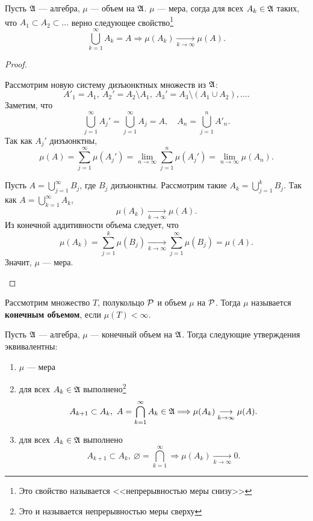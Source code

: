 \begin{thm}
    Пусть $ \A$ --- алгебра, $ \mu$ --- объем на $ \A$. $ \mu $ --- мера, согда
	для всех $ A_k \in \A$ таких, что $ A_1 \subset A_2 \subset  \ldots $ верно следующее свойство\footnote{Это свойство называется <<непрерывностью меры  снизу>>}
	\[
		\bigcup_{k=1}^{\infty} A_k = A \Longrightarrow \mu (A_k) \underset{k \to  \infty}{ \longrightarrow} \mu (A)
	.\] 
\end{thm}
\begin{proof}
    $ $
    \begin{description}
        \item {} Рассмотрим новую систему дизъюнктных множеств из $ \A$:
			 \[
				 A'_1 = A_1, ~A_2' = A_2 \setminus A_1, ~A_3' = A_3\setminus (A_1\cup A_2) , \ldots 
			.\] 
			Заметим, что
			\[
			\bigcup_{j=1}^{\infty} A_j' = \bigcup_{j=1}^{\infty} A_j = A, \quad  A_n = \bigcup_{j=1}^{n} A'_n
			.\] 
			Так как $ A_j'$ дизъюнктны, 
			\[
				\mu (A) = \sum_{j=1}^{\infty} \mu (A_j') = \lim_{n \to \infty} \sum_{j=1}^{n} \mu (A_j') = \lim_{n \to \infty} \mu (A_n)
			.\]
        \item {} 
			Пусть $ A = \bigcup\limits_{j=1}^{\infty} B_j$, где $ B_j$ дизъюнктны. Рассмотрим такие $ A_k = \bigcup\limits_{j=1}^{k} B_j$. Так как $ A =  \bigcup\limits_{k=1}^{\infty} A_k$,
			\[
				\mu (A_k) \underset{k \to  \infty}{\longrightarrow} \mu (A)
			.\] 
		Из конечной аддитивности объема следует, что
		 \[
			 \mu (A_k) = \sum_{j=1}^{k} \mu (B_j) \underset{k \to  \infty}{\longrightarrow}\sum_{j=1}^{\infty} \mu (B_j) = \mu (A)
		.\] 
		Значит, $ \mu $ --- мера.
    \end{description} 
\end{proof}
\begin{defn}
	Рассмотрим множество $ T$,  полукольцо $ \P$ и объем $ \mu $ на $ \P$. Тогда  $ \mu$ называется {\bf конечным объемом}, если  $ \mu (T) < \infty$. 
\end{defn}
\begin{thm}
	Пусть $ \A$ --- алгебра, $ \mu $ --- конечный объем на $ \A$. Тогда следующие утверждения эквивалентны:
\begin{enumerate}[label=(\roman*),noitemsep]
    \item  $ \mu $ --- мера
	\item для всех $ A_k \in \A $ выполнено\footnote{Это и называется непрерывностью меры сверху}
		\[
			A_{k+1 } \subset A_k , ~ A= \bigcap_{k=1}^{\infty} A_k \in \A \Longrightarrow \mu (A_k) \underset{k \to  \infty}{\longrightarrow} \mu (A)
		.\]  

	\item для всех $ A_k \in \A$ выполнено
		\[
			A_{k+1 } \subset A_k , ~ \varnothing= \bigcap_{k=1}^{\infty} \Longrightarrow \mu (A_k) \underset{k \to  \infty}{\longrightarrow} 0
		.\] 
\end{enumerate} 
\end{thm}
